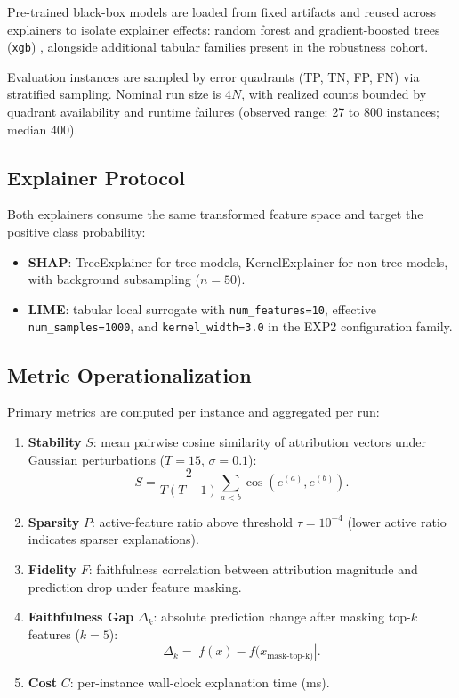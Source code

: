 \documentclass[twoside,11pt]{article}
\begin{document}
Pre-trained black-box models are loaded from fixed artifacts and
reused across explainers to isolate explainer effects:
random forest \citep{breiman2001random} and gradient-boosted trees
(\texttt{xgb}) \citep{chen2016xgboost}, alongside additional tabular
families present in the robustness cohort.

Evaluation instances are sampled by error quadrants (TP, TN, FP, FN) via
stratified sampling. Nominal run size is \(4N\), with realized counts
bounded by quadrant availability and runtime failures (observed range:
27 to 800 instances; median 400).

\subsection{Explainer Protocol}
Both explainers consume the same transformed feature space and target the
positive class probability:
\begin{itemize}[leftmargin=*]
\item \textbf{SHAP}: TreeExplainer for tree models, KernelExplainer for
non-tree models, with background subsampling (\(n=50\)).
\item \textbf{LIME}: tabular local surrogate with
\texttt{num\_features=10}, effective \texttt{num\_samples=1000}, and
\texttt{kernel\_width=3.0} in the EXP2 configuration family.
\end{itemize}

\subsection{Metric Operationalization}
Primary metrics are computed per instance and aggregated per run:
\begin{enumerate}[leftmargin=*]
\item \textbf{Stability} \(S\): mean pairwise cosine similarity of
attribution vectors under Gaussian perturbations (\(T=15\),
\(\sigma=0.1\)):
\[
S = \frac{2}{T(T-1)}\sum_{a<b}\cos\!\left(e^{(a)},e^{(b)}\right).
\]
\item \textbf{Sparsity} \(P\): active-feature ratio above threshold
\(\tau=10^{-4}\) (lower active ratio indicates sparser explanations).
\item \textbf{Fidelity} \(F\): faithfulness correlation between
attribution magnitude and prediction drop under feature masking.
\item \textbf{Faithfulness Gap} \(\Delta_k\): absolute prediction change
after masking top-\(k\) features (\(k=5\)):
\[
\Delta_k=\left|f(x)-f(x_{\mathrm{mask\text{-}top\text{-}k})}\right|.
\]
\item \textbf{Cost} \(C\): per-instance wall-clock explanation time (ms).
\end{enumerate}
\end{document}
